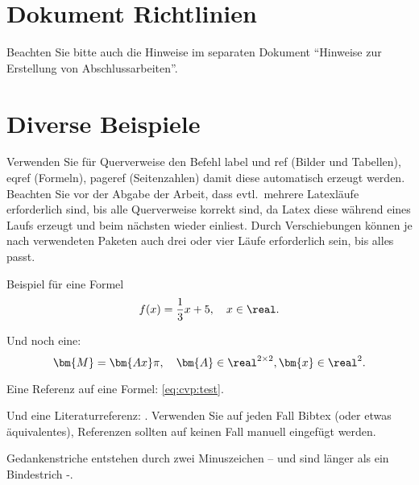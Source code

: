 \section{Dokument Richtlinien}
Beachten Sie bitte auch die Hinweise im separaten Dokument "`Hinweise zur Erstellung von Abschlussarbeiten"'.

\section{Diverse Beispiele}

Verwenden Sie für Querverweise den Befehl label und  ref (Bilder und Tabellen), eqref (Formeln), pageref (Seitenzahlen) damit diese automatisch erzeugt werden.
Beachten Sie vor der Abgabe der Arbeit, dass evtl.\ mehrere Latexläufe erforderlich sind, bis alle Querverweise korrekt sind, da Latex diese während eines Laufs erzeugt und beim nächsten wieder einliest.
Durch Verschiebungen können je nach verwendeten Paketen auch drei oder vier Läufe erforderlich sein, bis alles passt.



Beispiel für eine Formel
\begin{equation}
\label{eq:cvp:test}
f(x) = \frac{1}{3} x + 5, \quad x \in \real.
\end{equation}

Und noch eine:
\begin{equation}
\label{eq:cvp:matvec}
\bm{M}  = \bm{Ax} \pi, \quad \bm{A} \in \real^{2 \times 2}, \bm{x} \in \real^2.
\end{equation}

Eine Referenz auf eine Formel: \eqref{eq:cvp:test}.

Und eine Literaturreferenz: \cite{Auer00:HTF}.
Verwenden Sie auf jeden Fall Bibtex (oder etwas äquivalentes), Referenzen sollten auf keinen Fall manuell eingefügt werden.

Gedankenstriche entstehen durch zwei Minuszeichen -- und sind länger als ein Bindestrich -.

